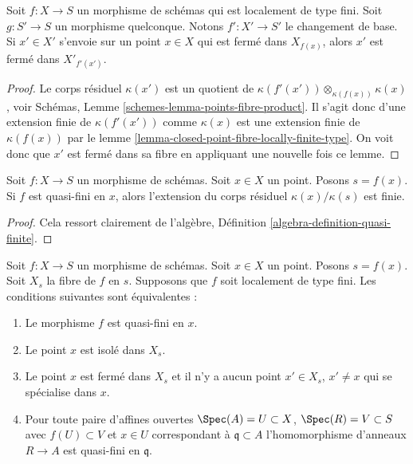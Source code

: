 \begin{lemma}
\label{lemma-base-change-closed-point-fibre-locally-finite-type}
Soit $f : X \to S$ un morphisme de schémas qui est localement de type fini. Soit $g : S' \to S$
un morphisme quelconque. Notons $f' : X' \to S'$ le changement de base. Si $x' \in X'$
s'envoie sur un point $x \in X$ qui est fermé dans $X_{f(x)}$, alors
$x'$ est fermé dans $X'_{f'(x')}$.
\end{lemma}

\begin{proof}
Le corps résiduel $\kappa(x')$ est un quotient
de $\kappa(f'(x')) \otimes_{\kappa(f(x))} \kappa(x)$, voir Schémas, Lemme
\ref{schemes-lemma-points-fibre-product}. Il s'agit donc d'une extension finie
de $\kappa(f'(x'))$ comme $\kappa(x)$ est une
extension finie de $\kappa(f(x))$ par le lemme
\ref{lemma-closed-point-fibre-locally-finite-type}. On voit donc que $x'$ est
fermé dans sa fibre en appliquant une nouvelle fois
ce lemme.
\end{proof}

\begin{lemma}
\label{lemma-residue-field-quasi-finite}
Soit $f : X \to S$ un morphisme de schémas. Soit
$x \in X$ un point. Posons $s = f(x)$. Si
$f$ est quasi-fini en $x$, alors l'extension
du corps résiduel $\kappa(x)/\kappa(s)$ est finie.
\end{lemma}

\begin{proof}
Cela ressort clairement de l'algèbre, Définition \ref{algebra-definition-quasi-finite}.
\end{proof}

\begin{lemma}
\label{lemma-quasi-finite-at-point-characterize}
Soit $f : X \to S$ un morphisme de schémas. Soit $x \in X$
un point. Posons $s = f(x)$. Soit $X_s$ la fibre
de $f$ en $s$. Supposons que $f$
soit localement de type fini. Les conditions
suivantes sont équivalentes :
\begin{enumerate}
\item Le morphisme $f$ est quasi-fini en $x$.
\item Le point $x$ est isolé dans $X_s$.
\item Le point $x$ est fermé dans $X_s$
et il n'y a aucun point $x' \in X_s$, $x' \not = x$ qui se
spécialise dans $x$.
\item Pour toute paire d'affines
ouvertes $\Spec(A) = U \subset X$, $\Spec(R) = V \subset S$ avec $f(U) \subset V$
et $x \in U$ correspondant à $\mathfrak q \subset A$ l'homomorphisme d'anneaux
$R \to A$ est quasi-fini en $\mathfrak q$.
\end{enumerate}
\end{lemma}

